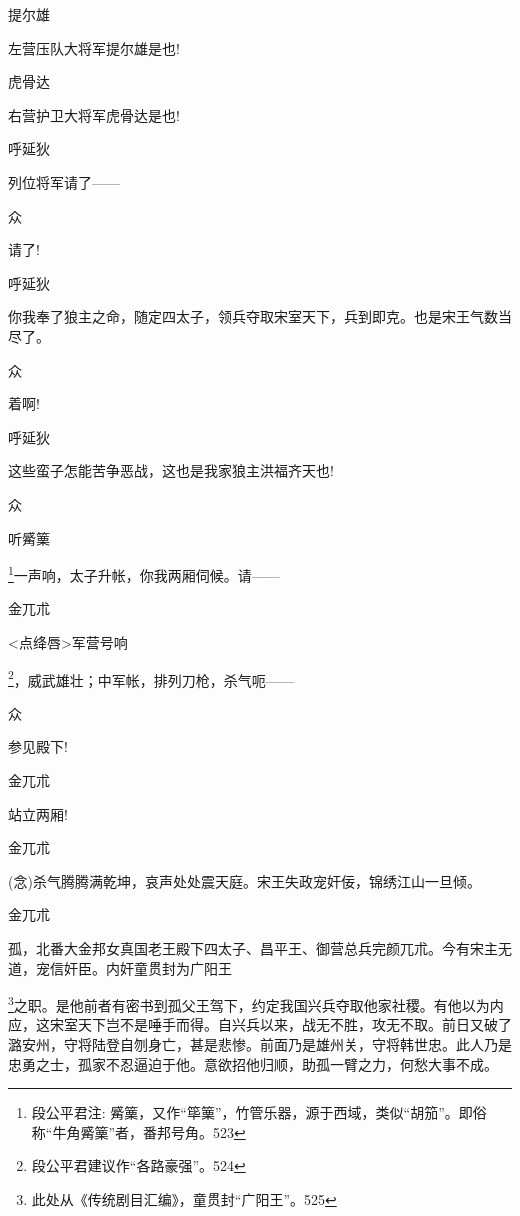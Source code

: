 {提尔雄\hspace{20pt}~

左营压队大将军提尔雄是也!}

{虎骨达\hspace{20pt}~

右营护卫大将军虎骨达是也!}

{呼延狄\hspace{20pt}~

列位将军请了------}

{众\hspace{40pt}~

请了!}

{呼延狄

你我奉了狼主之命，随定四太子，领兵夺取宋室天下，兵到即克。也是宋王气数当尽了。}

{众\hspace{40pt}~

着啊!}

{呼延狄\hspace{20pt}~

这些蛮子怎能苦争恶战，这也是我家狼主洪福齐天也!}

{众

听觱篥}\footnote{ 段公平君注: 觱篥，又作``筚篥''，竹管乐器，源于西域，类似``胡笳''。即俗称``牛角觱篥''者，番邦号角。{523}}{一声响，太子升帐，你我两厢伺候。请------}

{金兀朮

\textless{}点绛唇\textgreater{}军营号响}\footnote{ 段公平君建议作``各路豪强''。{524}}{，威武雄壮；中军帐，排列刀枪，杀气呃------}

{众\hspace{40pt}~

参见殿下!}

{金兀朮\hspace{20pt}~

站立两厢!}

{金兀朮

({\akai 念})杀气腾腾满乾坤，哀声处处震天庭。宋王失政宠奸佞，锦绣江山一旦倾。}

{金兀朮

孤，北番大金邦女真国老王殿下四太子、昌平王、御营总兵完颜兀朮。今有宋主无道，宠信奸臣。内奸童贯封为广阳王}\footnote{ 此处从《传统剧目汇编》，童贯封``广阳王''。{525}}{之职。是他前者有密书到孤父王驾下，约定我国兴兵夺取他家社稷。有他以为内应，这宋室天下岂不是唾手而得。自兴兵以来，战无不胜，攻无不取。前日又破了潞安州，守将陆登自刎身亡，甚是悲惨。前面乃是雄州关，守将韩世忠。此人乃是忠勇之士，孤家不忍逼迫于他。意欲招他归顺，助孤一臂之力，何愁大事不成。}

